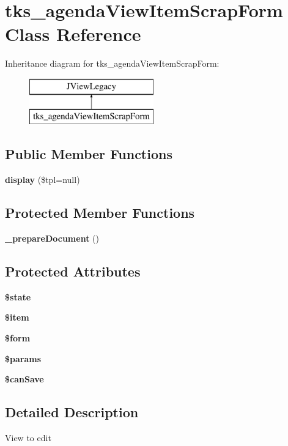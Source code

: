 \section{tks\+\_\+agenda\+View\+Item\+Scrap\+Form Class Reference}
\label{classtks__agenda_view_item_scrap_form}
Inheritance diagram for tks\+\_\+agenda\+View\+Item\+Scrap\+Form\+:\begin{figure}[H]
\begin{center}
\leavevmode
\includegraphics[height=2.000000cm]{classtks__agenda_view_item_scrap_form}
\end{center}
\end{figure}
\subsection*{Public Member Functions}
\begin{DoxyCompactItemize}
\item 
\textbf{ display} (\$tpl=null)
\end{DoxyCompactItemize}
\subsection*{Protected Member Functions}
\begin{DoxyCompactItemize}
\item 
\textbf{ \+\_\+prepare\+Document} ()
\end{DoxyCompactItemize}
\subsection*{Protected Attributes}
\begin{DoxyCompactItemize}
\item 
\textbf{ \$state}
\item 
\textbf{ \$item}
\item 
\textbf{ \$form}
\item 
\textbf{ \$params}
\item 
\textbf{ \$can\+Save}
\end{DoxyCompactItemize}


\subsection{Detailed Description}
View to edit

